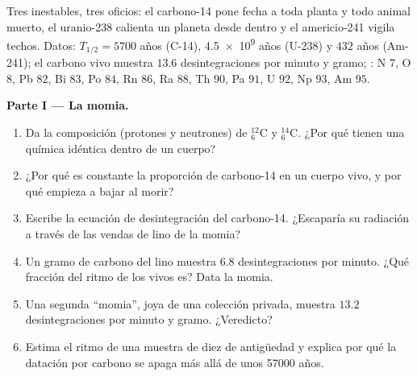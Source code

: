 \begin{problem}
\label{pb:g11:nucleus-radioactivity:1}
Tres  inestables, tres oficios: el carbono-14 pone fecha a toda
planta y todo animal muerto, el uranio-238 calienta un planeta desde
dentro y el americio-241 vigila techos. Datos:
$T_{1/2} = \num{5700}$ años (C-14), \num{4.5e9} años (U-238) y $432$
años (Am-241); el carbono vivo muestra $13.6$ desintegraciones por
minuto y gramo; : N $7$, O $8$, Pb $82$, Bi $83$, Po
$84$, Rn $86$, Ra $88$, Th $90$, Pa $91$, U $92$, Np $93$, Am $95$.

\medskip
\noindent\textbf{Parte I --- La momia.}
\begin{enumerate}
  \item Da la composición (protones y neutrones) de
        ${}^{12}_{6}\mathrm{C}$ y ${}^{14}_{6}\mathrm{C}$. ¿Por qué
        tienen una química idéntica dentro de un cuerpo?
  \item ¿Por qué es constante la proporción de carbono-14 en un cuerpo
        vivo, y por qué empieza a bajar al morir?
  \item Escribe la ecuación de desintegración del carbono-14. ¿Escaparía
        su radiación a través de las vendas de lino de la momia?
  \item Un gramo de carbono del lino muestra $6.8$ desintegraciones por
        minuto. ¿Qué fracción del ritmo de los vivos es? Data la momia.
  \item Una segunda ``momia'', joya de una colección privada, muestra
        $13.2$ desintegraciones por minuto y gramo. ¿Veredicto?
  \item Estima el ritmo de una muestra de diez  de antigüedad y
        explica por qué la datación por carbono se apaga más allá de unos
        \num{57000} años.
\end{enumerate}


\end{problem}
